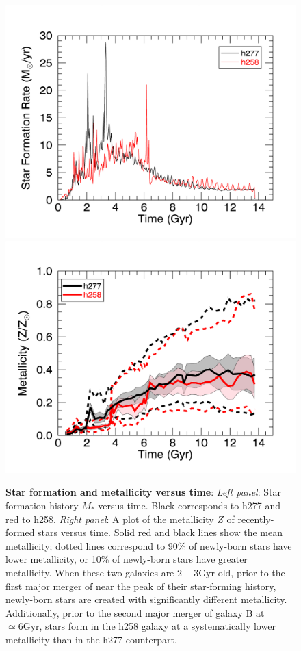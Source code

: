 \documentclass[nofootinbib,twocolumn,prd]{emulateapj}
\newcommand\unit[1]{\text{#1}}
\newcommand\ExcitingGalaxy{h258}
\newcommand\BoringGalaxy{h277}
\begin{document}
\begin{figure}
\includegraphics[width=\columnwidth]{Figures/sfh}
\includegraphics[width=\columnwidth]{Figures/zvst}
\caption{\label{fig:TwoGalaxies}\textbf{Star formation and metallicity versus time}:  \emph{Left panel}: Star formation history $\dot{M}_{*}$
  versus time.  Black corresponds to \BoringGalaxy{} and red to \ExcitingGalaxy.  
\emph{Right panel}: A plot of the  metallicity $Z$ of recently-formed stars versus time.  Solid red and black lines show
the mean metallicity; dotted lines correspond to  90\% of newly-born stars have lower metallicity,   or 10\% of
newly-born stars have greater metallicity.  When these two galaxies are $2-3\unit{Gyr}$ old, prior to the first major
merger of  near the peak of their
star-forming history, newly-born stars are created with significantly different metallicity.  Additionally, prior to the
second major merger of galaxy B at $\simeq 6\unit{Gyr}$, stars form in the \ExcitingGalaxy{} galaxy at a systematically lower
metallicity than in the \BoringGalaxy{} counterpart.
}
\end{figure}
\end{document}
